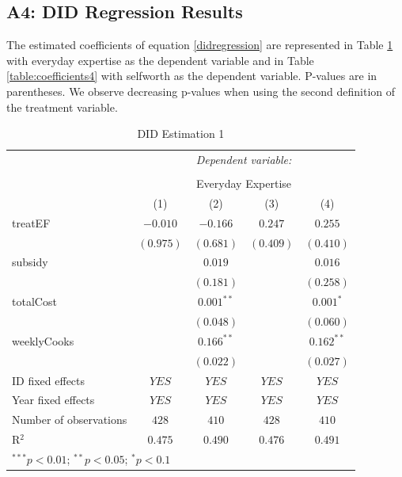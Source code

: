 \documentclass[12pt, a4paper, titlepage]{article}\usepackage[]{graphicx}\usepackage[]{color}
\begin{document}
\subsection{A4: DID Regression Results}

The estimated coefficients of equation \ref{didregression} are represented in Table \ref{table:coefficients3} with everyday expertise as the dependent variable and in Table \ref{table:coefficients4} with selfworth as the dependent variable. P-values are in parentheses. We observe decreasing p-values when using the second definition of the treatment variable.

\begin{table}
\begin{center}
\begin{tabular}{l c c c c}
& \multicolumn{4}{c}{\textit{Dependent variable:}} \\
\cline{2-5}
\\[-1.8ex] & \multicolumn{4}{c}{Everyday Expertise} \\
\hline
 & (1) & (2) & (3) & (4) \\
\hline
treatEF                & $-0.010$  & $-0.166$     & $0.247$   & $0.255$      \\
                       & $(0.975)$ & $(0.681)$    & $(0.409)$ & $(0.410)$    \\
subsidy                &           & $0.019$      &           & $0.016$      \\
                       &           & $(0.181)$    &           & $(0.258)$    \\
totalCost              &           & $0.001^{**}$ &           & $0.001^{*}$  \\
                       &           & $(0.048)$    &           & $(0.060)$    \\
weeklyCooks            &           & $0.166^{**}$ &           & $0.162^{**}$ \\
                       &           & $(0.022)$    &           & $(0.027)$    \\
\hline
ID fixed effects       & $YES$     & $YES$        & $YES$     & $YES$        \\
Year fixed effects     & $YES$     & $YES$        & $YES$     & $YES$        \\
Number of observations & $428$     & $410$        & $428$     & $410$        \\
R$^2$                  & $0.475$   & $0.490$      & $0.476$   & $0.491$      \\
\hline
\multicolumn{5}{l}{\scriptsize{$^{***}p<0.01$; $^{**}p<0.05$; $^{*}p<0.1$}}
\end{tabular}
\caption{DID Estimation 1}
\label{table:coefficients3}
\end{center}
\end{table}
\end{document}
